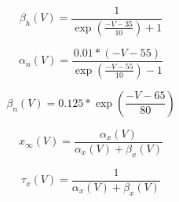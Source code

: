 \begin{equation}
\beta_h(V) = \frac{1}{\exp(\frac{-V - 35}{10}) + 1}
\end{equation}

\begin{equation}
\alpha_n(V) = \frac{0.01 * (-V - 55)}{\exp(\frac{-V - 55}{10}) - 1}
\end{equation}

\begin{equation}
\beta_n(V) = 0.125 * \exp(\frac{-V - 65}{80})
\end{equation}

\begin{equation}
x_{\infty}(V) = \frac{\alpha_x(V)}{\alpha_x(V) + \beta_x(V)}
\end{equation}

\begin{equation}
\tau_x(V) = \frac{1}{\alpha_x(V) + \beta_x(V)}
\end{equation}
